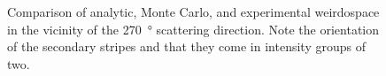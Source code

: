 \begin{figure}
  \caption{Comparison of analytic, Monte Carlo, and experimental weirdospace
    in the vicinity of the \SI{270}{\degree} scattering direction.  Note the
    orientation of the secondary stripes and that they come in intensity groups
    of two.}
  \label{fig:scat270degree}
\end{figure}

